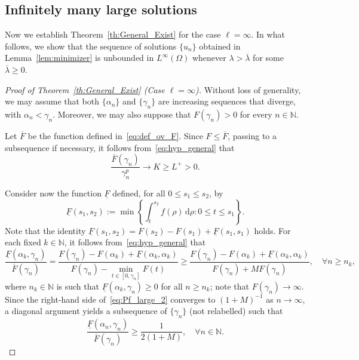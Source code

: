 \documentclass[10pt,twoside,english,reqno,a4paper]{amsart}
\theoremstyle{plain}
\theoremstyle{plain}
\theoremstyle{definition}
\theoremstyle{remark}
\numberwithin{equation}{section}
\newcommand{\N}{\mathbb{N}}
\newcommand{\oF}{\overline{F}}
\newcommand{\uF}{\underline{F}}
\newcommand{\oL}{L^+}
\begin{document}
\subsection{Infinitely many large solutions}

Now we establish Theorem~\ref{th:General_Exist} for the case $\ell=\infty$. In what follows, we show that the sequence of solutions $\{u_n\}$ obtained in Lemma~\ref{lem:minimizer} is unbounded in $L^\infty(\Omega)$ whenever $\lambda > \overline{\lambda}$ for some $\overline{\lambda}\geq 0$.

\begin{proof}[Proof of Theorem~\ref{th:General_Exist} (Case $\ell=\infty$)]

Without loss of generality, we may assume that both $\{\alpha_n\}$ and $\{\gamma_n\}$ are increasing sequences that diverge, with $\alpha_n < \gamma_n$. Moreover, we may also suppose that $F(\gamma_n) > 0$ for every $n\in\N$.

Let $\oF$ be the function defined in~\eqref{eq:def_ov_F}. Since $F\leq \oF$, passing to a subsequence if necessary, it follows from~\eqref{eq:hyp_general} that
\begin{equation}
\label{eq:Pf_large_1}
\frac{\oF(\gamma_n)}{\gamma_n^p} \to K \geq \oL > 0.
\end{equation}

Consider now the function $\uF$ defined, for all $0 \leq s_1 \leq s_2$, by
\begin{equation*}
    \uF(s_1,s_2) := \min \left\{ \int_t^{s_2} f(\rho)\, \mathrm{d}\rho : 0\leq t\leq s_1 \right\}.
\end{equation*}
Note that the identity $\uF(s_1,s_2) = F(s_2)- F(s_1) + \uF(s_1,s_1)$ holds. For each fixed $k\in\N$, it follows from~\eqref{eq:hyp_general} that
\begin{equation}
\label{eq:Pf_large_2} 
\frac{\uF(\alpha_k,\gamma_n)}{\oF(\gamma_n)} = \frac{F(\gamma_n) - F(\alpha_k) + \uF(\alpha_k,\alpha_k)}{F(\gamma_n) - \min_{t\in [0,\gamma_n]} F(t)} \geq \frac{F(\gamma_n) - F(\alpha_k) + \uF(\alpha_k,\alpha_k)}{F(\gamma_n) + M F(\gamma_n)},\quad \forall n\geq n_k,
\end{equation}
where $n_k\in\N$ is such that $\uF(\alpha_k,\gamma_n) \geq 0$ for all $n\geq n_k$; note that $F(\gamma_n)\to\infty$. Since the right-hand side of~\eqref{eq:Pf_large_2} converges to $(1+M)^{-1}$ as $n\to \infty$, a diagonal argument yields a subsequence of $\{\gamma_n\}$ (not relabelled) such that
\begin{equation}
\label{eq:Pf_large_3} 
\frac{\uF(\alpha_n, \gamma_n)}{\oF(\gamma_n)} \geq \frac{1}{2(1+M)},\quad \forall n\in \N.
\end{equation}


\end{proof}
\end{document}
